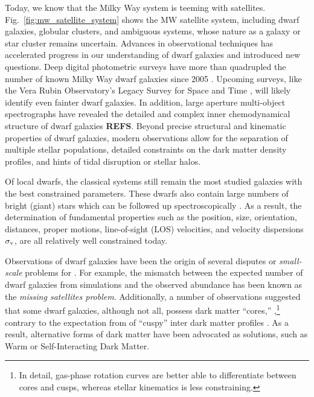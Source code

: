 Today, we know that the Milky Way system is teeming with satellites.
Fig.~\ref{fig:mw_satellite_system} shows the MW satellite system,
including dwarf galaxies, globular clusters, and ambiguous systems,
whose nature as a galaxy or star cluster remains uncertain. Advances in
observational techniques has accelerated progress in our understanding
of dwarf galaxies and introduced new questions. Deep digital photometric
surveys have more than quadrupled the number of known Milky Way dwarf
galaxies since 2005 \citep{simon2019}. Upcoming surveys, like the Vera
Rubin Observatory's Legacy Survey for Space and Time
\citep[LSST,][]{ivezic+2019}, will likely identify even fainter dwarf
galaxies. In addition, large aperture multi-object spectrographs have
revealed the detailed and complex inner chemodynamical structure of
dwarf galaxies \textbf{REFS}. Beyond precise structural and kinematic
properties of dwarf galaxies, modern observations allow for the
separation of multiple stellar populations, detailed constraints on the
dark matter density profiles, and hints of tidal disruption or stellar
halos.

Of local dwarfs, the classical systems still remain the most studied
galaxies with the best constrained parameters. These dwarfs also contain
large numbers of bright (giant) stars which can be followed up
spectroscopically \citep[e.g.,][]{tolstoy+2023, pace+2020}. As a result,
the determination of fundamental properties such as the position, size,
orientation, distances, proper motions, line-of-sight (LOS) velocities,
and velocity dispersions \(\sigma_{\rm v}\), are all relatively well
constrained today.

Observations of dwarf galaxies have been the origin of several disputes
or \emph{small-scale} problems for
. For
example, the mismatch between the expected number of dwarf galaxies from
simulations and the observed abundance has been known as the
\emph{missing satellites problem}. Additionally, a number of
observations suggested that some dwarf galaxies, although not all,
possess dark matter ``cores,''
\citep[e.g.,][]{moore1994, adams+2014, oh+2015, walker+penarrubia2011, read+walker+steger2019},\footnote{In
  detail, gas-phase rotation curves are better able to differentiate
  between cores and cusps, whereas stellar kinematics is less
  constraining.} contrary to the expectation from \LCDM of ``cuspy''
inter dark matter profiles \citep{NFW1996, NFW1997}. As a result,
alternative forms of dark matter have been advocated as solutions, such
as Warm or Self-Interacting Dark Matter.

